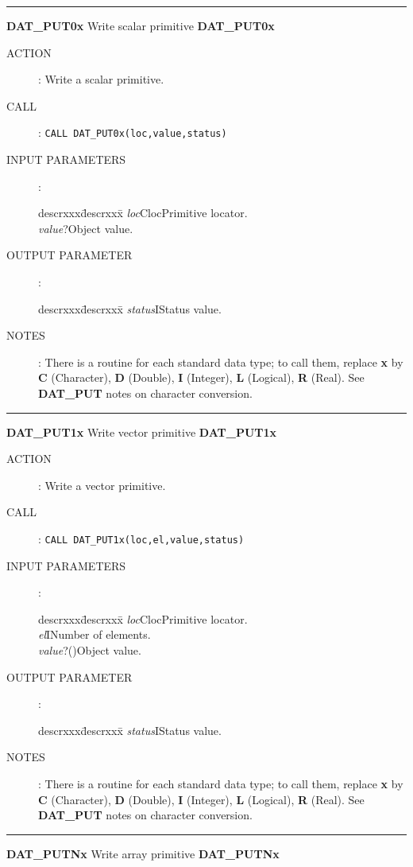 \goodbreak
\rule{\textwidth}{0.3mm}
{\Large {\bf DAT\_PUT0x} \hfill Write scalar primitive \hfill {\bf DAT\_PUT0x}}
\begin{description}
\item [ACTION]:
Write a scalar primitive.
\item [CALL]:
{\tt CALL DAT\_PUT0x(loc,value,status)}
\item [INPUT PARAMETERS]:
\begin{tabbing}
descrxxx\=descrxxx\=\kill
{\em loc}\>Cloc\>Primitive locator.\\
{\em value}\>?\>Object value.
\end{tabbing}
\item [OUTPUT PARAMETER]:
\begin{tabbing}
descrxxx\=descrxxx\=\kill
{\em status}\>I\>Status value.
\end{tabbing}
\item [NOTES]:
There is a routine for each standard data type; to call them, replace {\bf x}
by {\bf C} (Character), {\bf D} (Double), {\bf I} (Integer), {\bf L} (Logical),
{\bf R} (Real).
See {\bf DAT\_PUT} notes on character conversion.
\end{description}
\goodbreak
\rule{\textwidth}{0.3mm}
{\Large {\bf DAT\_PUT1x} \hfill Write vector primitive \hfill {\bf DAT\_PUT1x}}
\begin{description}
\item [ACTION]:
Write a vector primitive.
\item [CALL]:
{\tt CALL DAT\_PUT1x(loc,el,value,status)}
\item [INPUT PARAMETERS]:
\begin{tabbing}
descrxxx\=descrxxx\=\kill
{\em loc}\>Cloc\>Primitive locator.\\
{\em el}\>I\>Number of elements.\\
{\em value}\>?()\>Object value.
\end{tabbing}
\item [OUTPUT PARAMETER]:
\begin{tabbing}
descrxxx\=descrxxx\=\kill
{\em status}\>I\>Status value.
\end{tabbing}
\item [NOTES]:
There is a routine for each standard data type; to call them, replace {\bf x}
by {\bf C} (Character), {\bf D} (Double), {\bf I} (Integer), {\bf L} (Logical),
{\bf R} (Real).
See {\bf DAT\_PUT} notes on character conversion.
\end{description}
\goodbreak
\rule{\textwidth}{0.3mm}
{\Large {\bf DAT\_PUTNx} \hfill Write array primitive \hfill {\bf DAT\_PUTNx}}
